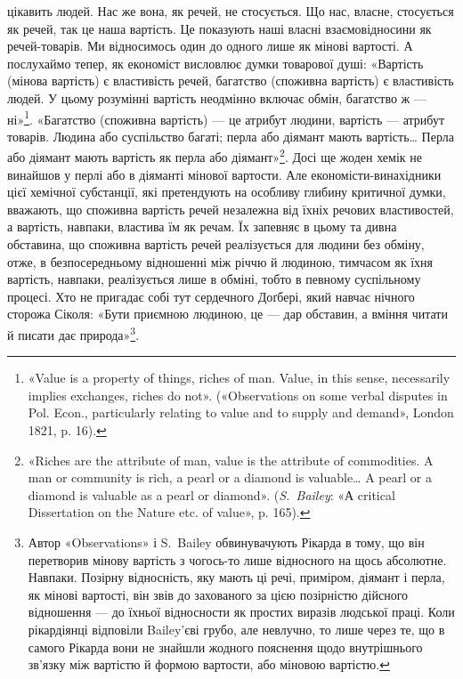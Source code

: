 \parcont{}  %
цікавить людей. Нас же вона, як речей, не стосується. Що нас,
власне, стосується як речей, так це наша вартість. Це показують
наші власні взаємовідносини як речей-товарів. Ми відносимось
один до одного лише як мінові вартості. А послухаймо
тепер, як економіст висловлює думки товарової душі: «Вартість
(мінова вартість) є властивість речей, багатство (споживна вартість)
є властивість людей. У цьому розумінні вартість неодмінно
включає обмін, багатство ж — ні»\footnote{
«Value is a property of things, riches of man. Value, in this sense,
necessarily implies exchanges, riches do not». («Observations on some verbal
disputes in Pol. Econ., particularly relating to value and to supply and
demand», London 1821, p. 16).
}. «Багатство (споживна вартість) —
це атрибут людини, вартість — атрибут товарів. Людина
або суспільство багаті; перла або діямант мають вартість\dots{}
Перла або діямант мають вартість як перла або діямант»\footnote{
«Riches are the attribute of man, value is the attribute of commodities.
A man or community is rich, a pearl or a diamond is valuable\dots{}
A pearl or a diamond is valuable as a pearl or diamond». (\emph{S.~Bailey}:
«А critical Dissertation on the Nature etc. of value», p. 165).
}.
Досі ще жоден хемік не винайшов у перлі або в діяманті мінової
вартости. Але економісти-винахідники цієї хемічної субстанції,
які претендують на особливу глибину критичної думки, вважають,
що споживна вартість речей незалежна від їхніх речових властивостей,
а вартість, навпаки, властива їм як речам. Їх запевняє
в цьому та дивна обставина, що споживна вартість речей реалізується
для людини без обміну, отже, в безпосередньому відношенні
між річчю й людиною, тимчасом як їхня вартість, навпаки,
реалізується лише в обміні, тобто в певному суспільному процесі.
Хто не пригадає собі тут сердечного Доґбері, який навчає нічного
сторожа Сіколя: «Бути приємною людиною, це — дар обставин,
а вміння читати й писати дає природа»\footnote{
Автор «Observations» і S.~Bailey обвинувачують Рікарда в тому,
що він перетворив мінову вартість з чогось-то лише відносного на щось
абсолютне. Навпаки. Позірну відносність, яку мають ці речі, приміром,
діямант і перла, як мінові вартості, він звів до захованого за цією позірністю
дійсного відношення — до їхньої відносности як простих виразів
людської праці. Коли рікардіянці відповіли Bailey’єві грубо, але невлучно,
то лише через те, що в самого Рікарда вони не знайшли жодного
пояснення щодо внутрішнього зв’язку між вартістю й формою вартости,
або міновою вартістю.
}.

